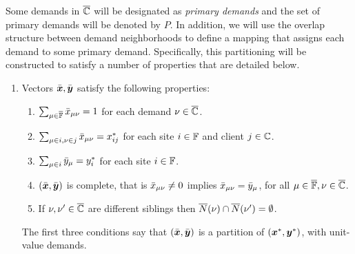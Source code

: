 \documentclass[11pt]{article}
\begin{document}
Some demands in $\overline{\mathbb{C}}$ will be designated as
\emph{primary demands} and the set of primary demands will
be denoted by $P$. In addition, we will use the overlap
structure between demand neighborhoods to define a mapping
that assigns each demand to some primary demand.
Specifically, this partitioning will be constructed to
satisfy a number of properties that are detailed below.
%
\begin{enumerate}
      \renewcommand{\theenumi}{P\arabic{enumi}}
      \renewcommand{\labelenumi}{(\theenumi)}
      \renewcommand{\theenumii}{(\alph{enumii})}
      \renewcommand{\labelenumii}{\theenumii}

\item Vectors $\bar{\boldsymbol{x}},\bar{\boldsymbol{y}}$ satisfy the following properties:
%
  \begin{enumerate}
	\item \label{P1:one} 
          $\sum_{\mu\in\overline{\mathbb{F}}} {\bar x}_{\mu\nu} = 1$ for each demand $\nu\in\overline{\mathbb{C}}$. 
	\item \label{P1:xij} $\sum_{\mu\in i, \nu\in j} {\bar x}_{\mu\nu}
          = x^\ast_{ij}$ for each site $i\in\mathbb{F}$ and client $j\in\mathbb{C}$.
	\item \label{P1:yi}
          $\sum_{\mu\in i} {\bar y}_{\mu} = y^\ast_i$ for each site $i\in\mathbb{F}$.
	\item \label{P1:complete}
          $(\bar{\boldsymbol{x}},\bar{\boldsymbol{y}})$ is complete, that is ${\bar x}_{\mu\nu}\neq 0$ implies
				${\bar x}_{\mu\nu} = {\bar y}_{\mu}$, for all 
						$\mu\in\overline{\mathbb{F}}, \nu\in\overline{\mathbb{C}}$.
	\item \label{P1:siblings disjoint}
		 If $\nu,\nu'\in\overline{\mathbb{C}}$ are different siblings
			then ${\overline{N}}(\nu)\cap {\overline{N}}(\nu') = \emptyset$.
  \end{enumerate}
%
  The first three conditions say that $(\bar{\boldsymbol{x}},\bar{\boldsymbol{y}})$ is
  a partition of $(\boldsymbol{x}^\ast,\boldsymbol{y}^\ast)$, with unit-value
  demands. 


\end{enumerate}
\end{document}
